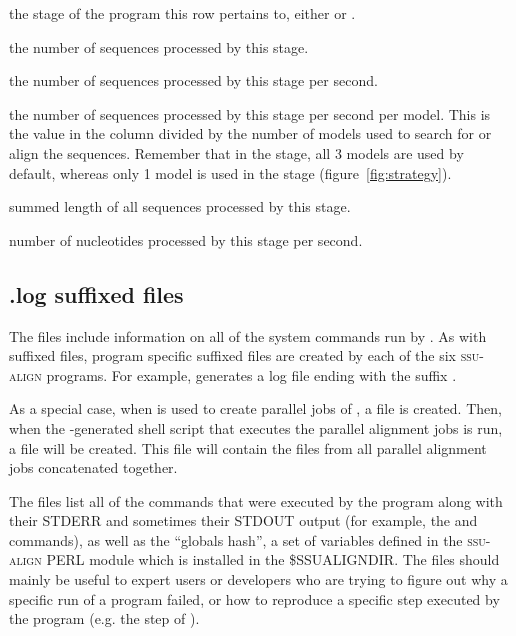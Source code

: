 \begin{wideitem}
\item[\emprog{stage}] the stage of the program this row pertains to,
  either  or .

\item[\emprog{num seqs}] the number of sequences processed by this stage.

\item[\emprog{seq/sec}] the number of sequences processed by this
  stage per second.

\item[\emprog{seq/sec/model}] the number of sequences processed by this
  stage per second per model. This is the value in the 
  column divided by the number of models used to search for or align
  the sequences. Remember that in the  stage, all 3
  models are used by default, whereas only 1 model is used in the
   stage (figure~\ref{fig:strategy}).

\item[\emprog{nucleotides}] summed length of all sequences processed
  by this stage.

\item[\emprog{nt/sec}] number of nucleotides processed by this stage
  per second.
\end{wideitem}

\subsection{.log suffixed files}

The  files include information on all of the system
commands run by . As with  suffixed files,
program specific  suffixed files are created by each of the
six \textsc{ssu-align} programs. For example, 
generates a log file ending with the suffix .


As a special case, when  is used to create parallel
jobs of , a  file is created. Then,
when the -generated shell script that executes the
parallel alignment jobs is run, a  file will be created.
This  file will contain the 
 files from all parallel alignment jobs
concatenated together.

The  files list all of the commands that were executed by
the program along with their STDERR and sometimes their STDOUT output
(for example, the  and  commands), as
well as the ``globals hash'', a set of variables defined in the
\textsc{ssu-align} PERL module  which is installed in the
\$SSUALIGNDIR. The  files should mainly be useful to expert 
users or developers who are trying to figure out why a specific run of a
program failed, or how to reproduce a specific step executed by the
program (e.g. the  step of ).

